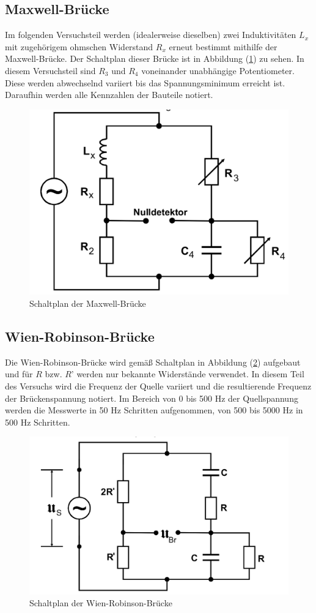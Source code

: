 \subsection{Maxwell-Brücke}
Im folgenden Versuchsteil werden (idealerweise dieselben) zwei Induktivitäten $L_x$ mit zugehörigem ohmschen Widerstand $R_x$ erneut bestimmt mithilfe der 
Maxwell-Brücke. Der Schaltplan dieser Brücke ist in Abbildung (\ref{pic:Maxwell-Bruecke}) zu sehen. In diesem Versuchsteil sind $R_3$ und $R_4$ voneinander unabhängige
Potentiometer. Diese werden abwechselnd variiert bis das Spannungsminimum erreicht ist. Daraufhin werden alle Kennzahlen der Bauteile notiert. 
\begin{figure}[H]
    \centering
    \includegraphics[width=0.4\linewidth]{Maxwell_Bruecke.png}
    \caption{Schaltplan der Maxwell-Brücke}
    \label{pic:Maxwell-Bruecke}
\end{figure} 
\subsection{Wien-Robinson-Brücke}
Die Wien-Robinson-Brücke wird gemäß Schaltplan in Abbildung (\ref{pic:WRB}) aufgebaut und für $R$ bzw. $R$' werden nur bekannte Widerstände verwendet. 
In diesem Teil des Versuchs wird die Frequenz der Quelle variiert und die resultierende Frequenz der Brückenspannung notiert. Im Bereich von 0 bis 500 Hz der Quellspannung 
werden die Messwerte in 50 Hz Schritten aufgenommen, von 500 bis 5000 Hz in 500 Hz Schritten. 
\begin{figure}[H]
    \centering
    \includegraphics[width=0.4\linewidth]{Wienrobinson_Bruecke.png}
    \caption{Schaltplan der Wien-Robinson-Brücke}
    \label{pic:WRB}
\end{figure} 
